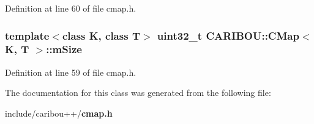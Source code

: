 Definition at line 60 of file cmap.\-h.

\subsubsection[{m\-Size}]{\setlength{\rightskip}{0pt plus 5cm}template$<$class K, class T$>$ uint32\-\_\-t {\bf C\-A\-R\-I\-B\-O\-U\-::\-C\-Map}$<$ K, T $>$\-::m\-Size\hspace{0.3cm}{\ttfamily [protected]}}\label{class_c_a_r_i_b_o_u_1_1_c_map_a525c81d3be31a134a5d4afc56eede27b}


Definition at line 59 of file cmap.\-h.



The documentation for this class was generated from the following file\-:\begin{DoxyCompactItemize}
\item 
include/caribou++/{\bf cmap.\-h}\end{DoxyCompactItemize}
